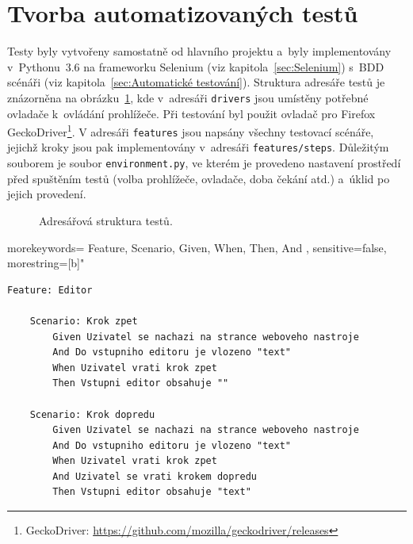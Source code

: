 \section{Tvorba automatizovaných testů}
Testy byly vytvořeny samostatně od hlavního projektu a~byly implementovány v~Pythonu~3.6 na frameworku Selenium (viz kapitola~\ref{sec:Selenium}) s~BDD scénáři (viz kapitola~\ref{sec:Automatické testování}). Struktura adresáře testů je znázorněna na obrázku~\ref{obr:Adresářová struktura testů}, kde v~adresáři \texttt{drivers} jsou umístěny potřebné ovladače k~ovládání prohlížeče. Při testování byl použit ovladač pro Firefox GeckoDriver\footnote{GeckoDriver: \url{https://github.com/mozilla/geckodriver/releases}}. V adresáři \texttt{features} jsou napsány všechny testovací scénáře, jejichž kroky jsou pak implementovány v~adresáři \texttt{features/steps}. Důležitým souborem je soubor \texttt{environment.py}, ve kterém je provedeno nastavení prostředí před spuštěním testů (volba prohlížeče, ovladače, doba čekání atd.) a~úklid po jejich provedení.
\begin{figure}[hb]
	\centering
	\setlength{\fboxsep}{4pt}
	\caption{Adresářová struktura testů.}
	\label{obr:Adresářová struktura testů}
\end{figure}
{
  morekeywords={
    Feature,
    Scenario,
    Given,
    When,
    Then,
    And
  },
  sensitive=false,
  morestring=[b]"
}
\begin{lstlisting}[caption={Testovací scénáře v~jazyce Gherkin.}, label={vyp:Testovací scénáře}]
Feature: Editor
    
    Scenario: Krok zpet
        Given Uzivatel se nachazi na strance weboveho nastroje
        And Do vstupniho editoru je vlozeno "text"
        When Uzivatel vrati krok zpet
        Then Vstupni editor obsahuje ""
        
    Scenario: Krok dopredu
        Given Uzivatel se nachazi na strance weboveho nastroje
        And Do vstupniho editoru je vlozeno "text"
        When Uzivatel vrati krok zpet
        And Uzivatel se vrati krokem dopredu
        Then Vstupni editor obsahuje "text"
\end{lstlisting}
